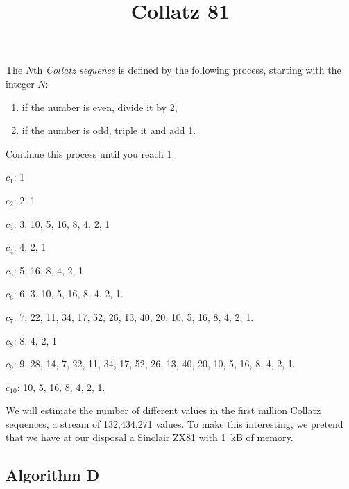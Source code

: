 \documentclass{tufte-handout}
\title{Collatz 81}
\author{}
\begin{document}
\maketitle




\bigskip\noindent
The $N$th \emph{Collatz sequence} is defined by the following process,
starting with the integer $N$:
\begin{enumerate}
\item if the number is even, divide it by 2,
\item if the number is odd, triple it and add 1.
\end{enumerate}
Continue this process until you reach 1.
\begin{marginfigure}
$c_1$: 1

\noindent $c_2$: 2, 1

\noindent $c_3$: 3, 10, 5, 16, 8, 4, 2, 1

\noindent $c_4$: 4, 2, 1

\noindent $c_5$: 5, 16, 8, 4, 2, 1

\noindent $c_6$: 6, 3, 10,
5, 16, 8, 4, 2, 1.

\noindent $c_7$: 7, 22, 11, 34, 17, 52, 26, 13, 40, 20, 10,
5, 16, 8, 4, 2, 1.

\noindent $c_8$: 8, 4, 2, 1

\noindent $c_9$: 9, 28, 14, 7, 22, 11, 34, 17, 52, 26, 13, 40, 20, 10,
5, 16, 8, 4, 2, 1.

\noindent $c_{10}$:  10,
5, 16, 8, 4, 2, 1.

\end{marginfigure}
\medskip
We will estimate the number of different values in the first million
Collatz sequences, a stream of 132,434,271 values.
To make this interesting, we pretend that we have at our disposal a
Sinclair ZX81 with 1~kB of memory.


\subsection{Algorithm D}
\end{document}
